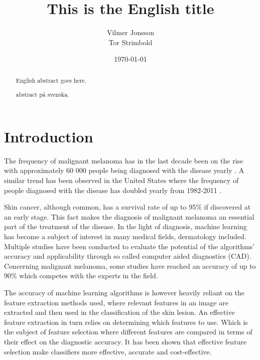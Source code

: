 \documentclass{kththesis}
\title{This is the English title}
\author{Vilmer Jonsson \\ Tor Strimbold}
\date{\today}
\begin{document}
\frontmatter

\titlepage

\begin{abstract}
  English abstract goes here.

  \blindtext
\end{abstract}


\begin{otherlanguage}{swedish}
  \begin{abstract}
    abstract på svenska.
  \end{abstract}
\end{otherlanguage}


\tableofcontents


\mainmatter


\chapter{Introduction}
The frequency of malignant melanoma has in the last decade been on the rise with approximately 60 000 people being diagnosed with the disease yearly \parencite{sverige-hudcancer}.
A similar trend has been observed in the United States where the frequency of people diagnosed with the disease has doubled yearly from 1982-2011 \parencite{aad-skin-cancer}.

Skin cancer, although common, has a survival rate of up to 95\% if discovered at an early stage. %
This fact makes the diagnosis of malignant melanoma an essential part of the treatment of the disease. In the light of diagnosis, machine learning has become a subject of interest in many medical fields, dermatology included. Multiple studies have been conducted to evaluate the potential of the algorithms’ accuracy and applicability through so called computer aided diagnostics (CAD). Concerning malignant melanoma, some studies have reached an accuracy of up to 90\% which competes with the experts in the field. %

The accuracy of machine learning algorithms is however heavily reliant on the feature extraction methods used, where relevant features in an image are extracted and then used in the classification of the skin lesion. An effective feature extraction in turn relies on determining which features to use. Which is the subject of feature selection where different features are compared in terms of their effect on the diagnostic accuracy. It has been shown that effective feature selection make classifiers more effective, accurate and cost-effective. \parencite{KarabulutEsraMahsereci2012Acso}
\end{document}
